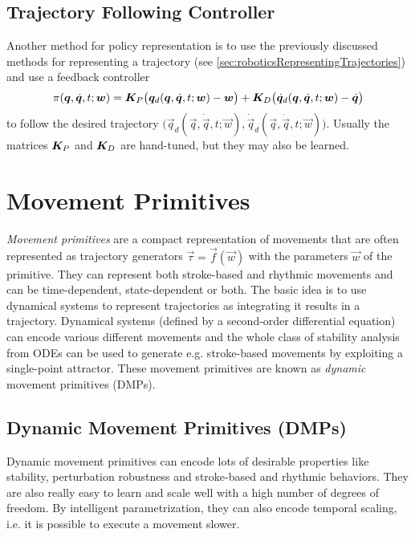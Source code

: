 		\subsection{Trajectory Following Controller}
			Another method for policy representation is to use the previously discussed methods for representing a trajectory (see \autoref{sec:roboticsRepresentingTrajectories}) and use a feedback controller
			\begin{equation*}
				\pi(\bm{q}, \dot{\bm{q}}, t; \bm{w}) = \bm{K}_P\big( \bm{q}_d(\bm{q}, \dot{\bm{q}}, t; \bm{w}) - \bm{w} \big) + \bm{K}_D\big( \dot{\bm{q}}_d(\bm{q}, \dot{\bm{q}}, t; \bm{w}) - \dot{\bm{q}} \big)
			\end{equation*}
			to follow the desired trajectory \( \big( \vec{q}_d(\vec{q}, \dot{\vec{q}}, t; \vec{w}), \dot{\vec{q}}_d(\vec{q}, \dot{\vec{q}}, t; \vec{w}) \big) \). Usually the matrices \( \bm{K}_P \) and \( \bm{K}_D \) are hand-tuned, but they may also be learned.

	\section{Movement Primitives}
		\emph{Movement primitives} are a compact representation of movements that are often represented as trajectory generators \( \vec{\tau} = \vec{f}(\vec{w}) \) with the parameters \( \vec{w} \) of the primitive. They can represent both stroke-based and rhythmic movements and can be time-dependent, state-dependent or both. The basic idea is to use dynamical systems to represent trajectories as integrating it results in a trajectory. Dynamical systems (defined by a second-order differential equation) can encode various different movements and the whole class of stability analysis from ODEs can be used to generate e.g. stroke-based movements by exploiting a single-point attractor. These movement primitives are known as \emph{dynamic} movement primitives (DMPs).

		\subsection{Dynamic Movement Primitives (DMPs)}
			Dynamic movement primitives can encode lots of desirable properties like stability, perturbation robustness and stroke-based and rhythmic behaviors. They are also really easy to learn and scale well with a high number of degrees of freedom. By intelligent parametrization, they can also encode temporal scaling, i.e. it is possible to execute a movement slower.

